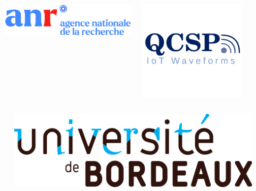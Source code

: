 \documentclass[hidelinks, french, xcolor={table, rgb, dvipsnames, x11names}, aspectratio=169, professionalfonts]{beamer}
\begin{document}
\begin{frame}
\begin{columns}
\begin{column}{.6\linewidth}
\begin{columns}
        \begin{column}{.13\linewidth} \centering
          \includegraphics[width=\linewidth]{anr-logo-2021.png}
        \end{column}
        \begin{column}{.13\linewidth} \centering
          \includegraphics[width=\linewidth]{QCSP_Logo.pdf}
        \end{column}
        \begin{column}{.11\linewidth}
          \hfill
        \end{column}\subsecname
      \end{columns}
      \begin{columns}
        \begin{column}{.22\linewidth}
          \hfill
        \end{column}
        \begin{column}{.16\linewidth} \centering
          \includegraphics[width=\linewidth]{universite-bordeaux.eps.pdf}

\end{column}
\end{columns}
\end{column}
\end{columns}
\end{frame}
\end{document}
